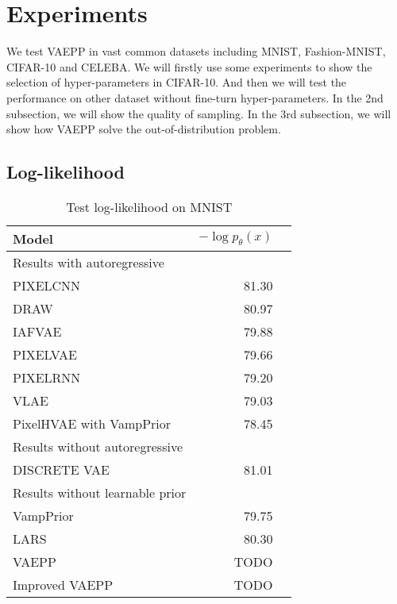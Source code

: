 \section{Experiments}
We test VAEPP in vast common datasets including MNIST, Fashion-MNIST, CIFAR-10 and CELEBA. 
We will firstly use some experiments to show the selection of hyper-parameters in CIFAR-10. And then we will test the performance on other dataset without fine-turn hyper-parameters. In the 2nd subsection, we will show the quality of sampling. In the 3rd subsection, we will show how VAEPP solve the out-of-distribution problem. 
\subsection{Log-likelihood}

\begin{table}
\centering
\begin{tabular}{lrr}  
\toprule
Model  &  $-\log p_\theta(x)$ \\
\midrule
Results with autoregressive   \\
PIXELCNN         &  81.30      \\
DRAW             &  80.97      \\
IAFVAE           &  79.88      \\
PIXELVAE         &  79.66      \\
PIXELRNN         &  79.20      \\
VLAE             &  79.03      \\
PixelHVAE with VampPrior        &  78.45      \\
\midrule
Results without autoregressive   \\
DISCRETE VAE     &  81.01      \\
\midrule
Results without learnable prior   \\
VampPrior        &  79.75      \\
LARS             &  80.30     \\
VAEPP            &  TODO      \\
Improved VAEPP   &  TODO      \\
\bottomrule
\end{tabular}
\caption{Test log-likelihood on MNIST}
\label{tab:mnist-nll}
\end{table}


